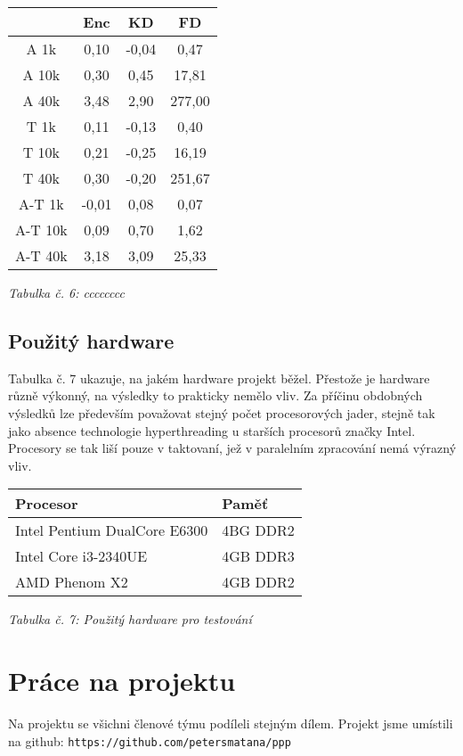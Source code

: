 \documentclass{article}
\begin{document}
\begin{center}
	\begin{tabular}{ c | c | c | c }
		 & Enc & KD & FD \\
		\hline
		\hline
		A 1k & 0,10 & -0,04 & 0,47 \\
		\hline
		A 10k & 0,30 & 0,45 & 17,81 \\
		\hline
		A 40k & 3,48 & 2,90 & 277,00 \\
		\hline
		T 1k & 0,11 & -0,13 & 0,40 \\
		\hline
		T 10k & 0,21 & -0,25 & 16,19 \\
		\hline
		T 40k & 0,30 & -0,20 & 251,67 \\
		\hline
		A-T 1k & -0,01 & 0,08 & 0,07 \\
		\hline
		A-T 10k & 0,09 & 0,70 & 1,62 \\
		\hline
		A-T 40k & 3,18 & 3,09 & 25,33 \\
	\end{tabular}
	\newline
	\textit{Tabulka č. 6: cccccccc}
\end{center}


\subsection{Použitý hardware}
Tabulka č. 7 ukazuje, na jakém hardware projekt běžel. Přestože je hardware
různě výkonný, na výsledky to prakticky nemělo vliv. Za příčinu obdobných
výsledků lze především považovat stejný počet procesorových jader, stejně
tak jako absence technologie hyperthreading u starších procesorů značky Intel.
Procesory se tak liší pouze v taktovaní, jež v paralelním zpracování nemá výrazný vliv.
\newline
\begin{center}
	\begin{tabular}{ l | l }
		\textbf{Procesor} & \textbf{Paměť} \\
		\hline
		\hline
		Intel Pentium DualCore E6300 & 4BG DDR2 \\
		\hline
		Intel Core i3-2340UE & 4GB DDR3 \\
		\hline
		AMD Phenom X2 & 4GB DDR2 \\
	\end{tabular}
	\newline
	\textit{Tabulka č. 7: Použitý hardware pro testování}
\end{center}

\section{Práce na projektu}
Na projektu se všichni členové týmu podíleli stejným dílem. Projekt jsme
umístili na github: \texttt{https://github.com/petersmatana/ppp}
\end{document}

